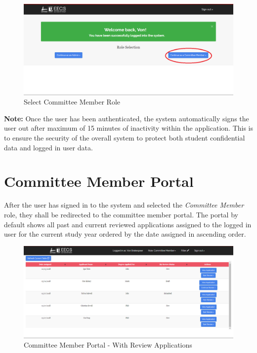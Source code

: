 \documentclass[fontsize=12pt,paper=letter,twoside]{scrartcl}
\begin{document}
\begin{figure}[!htb]
\begin{center}
\includegraphics[width=.9\textwidth]{images/auth.png}
\end{center}
\caption{Select Committee Member Role}
\label{fig:role_selection}
\end{figure}

\bigskip
\noindent \textbf{Note:} Once the user has been authenticated, the system automatically signs the user out after maximum of 15 minutes of inactivity within the application. This is to ensure the security of the overall system to protect both student confidential data and logged in user data.


\section{Committee Member Portal}

After the user has signed in to the system and selected the \emph{Committee Member} role, they shall be redirected to the committee member portal. The portal by default shows all past and current reviewed applications assigned to the logged in user for the current study year ordered by the date assigned in ascending order.

\begin{figure}[!htb]
\begin{center}
\includegraphics[width=.9\textwidth]{images/default_table.png}
\end{center}
\caption{Committee Member Portal - With Review Applications}
\label{fig:cm_portal}
\end{figure}
\end{document}

